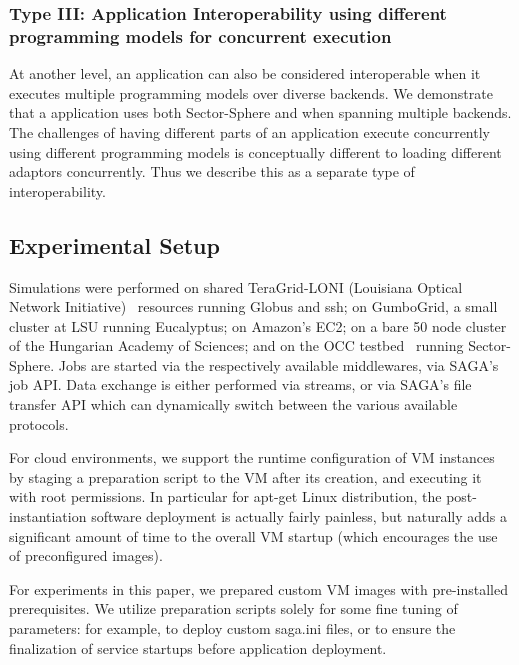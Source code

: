 \documentclass[graybox]{svmult}
\begin{document}
\subsubsection{Type III: Application Interoperability using different
  programming models for concurrent execution}
%
%

At another level, an application can also be considered interoperable
when it executes multiple programming models  over
diverse backends.  We demonstrate that a \wc application uses both
Sector-Sphere and \smr when spanning  multiple backends.  The
challenges of having different parts of an application execute
concurrently using different programming models is conceptually
different to loading different adaptors concurrently. Thus we describe
this as a separate type of interoperability.

\subsection{Experimental Setup}

Simulations were performed on shared TeraGrid-LONI (Louisiana Optical
Network Initiative)~\cite{loni-url} resources running Globus and ssh;
on GumboGrid, a small cluster at LSU running Eucalyptus; on Amazon's
EC2; on a bare 50 node cluster of the Hungarian Academy of Sciences;
and on the OCC testbed~\cite{occ_testbed} running Sector-Sphere.  Jobs
are started via the respectively available middlewares, via SAGA's job
API.  Data exchange is either performed via streams, or via SAGA's
file transfer API which can dynamically switch between the various
available protocols.

For cloud environments, we support the runtime configuration of VM
instances by staging a preparation script to the VM after its
creation, and executing it with root permissions.  In particular for
apt-get Linux distribution, the post-instantiation software deployment
is actually fairly painless, but naturally adds a significant amount
of time to the overall VM startup (which encourages the use of
preconfigured images).

For experiments in this paper, we prepared custom VM images with
pre-installed prerequisites.  We utilize preparation scripts solely
for some fine tuning of parameters: for example, to deploy custom
saga.ini files, or to ensure the finalization of service startups
before application deployment.
\end{document}
